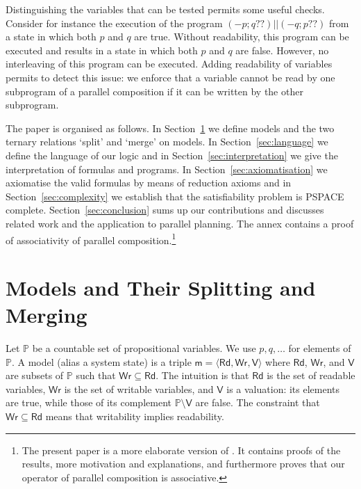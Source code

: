 \documentclass{llncs}
\newcommand{\atmset}{\mathtt{\mathbb X}}	%
\newcommand{\modl}{\mathsf m}
\newcommand{\pll}{ {||} }							%
\newcommand{\readable}[1]{\mathtt{r}_{#1}}
\newcommand{\readset}{\mathsf{Rd}}
\newcommand{\valuset}{\mathsf{V}}
\newcommand{\writable}[1]{\mathtt{w}_{#1}}
\newcommand{\writeset}{\mathsf{Wr}}
\newcommand{\testendo}{?\!\!?}			%
\newcommand{\assgnbotV}[1]{{\mathtt {-} #1}}
\newcommand{\propset}{\mathbb P}
\newcommand{\tuple}[1]{ \langle #1 \rangle}
\begin{document}
Distinguishing the variables that can be tested %
permits some useful checks.
Consider for instance the execution of the program $\left(\assgnbotV p ; q \testendo \right) \pll \left(\assgnbotV q ; p \testendo\right)$
from a state in which both $p$ and $q$ are true.
Without readability, this program can be executed and results in a state in which both $p$ and $q$ are false.
However, no interleaving of this program can be executed.
Adding readability of variables permits to detect this issue:
we enforce that a variable cannot be read by one subprogram of a parallel composition if it can be written by the other subprogram.

The paper is organised as follows.
In Section~\ref{sec:models} we define models and the two ternary relations `split' and `merge' on models. 
In Section~\ref{sec:language} we define the language of our logic and 
in Section~\ref{sec:interpretation} we give the interpretation of formulas and programs. 
In Section~\ref{sec:axiomatisation} we axiomatise the valid formulas by means of reduction axioms and
in Section~\ref{sec:complexity} we establish that the satisfiability problem is PSPACE complete. 
Section~\ref{sec:conclusion} sums up our contributions and discusses related work and the application to parallel planning. 
The annex contains a proof of associativity of parallel composition.\footnote{
The present paper is a more elaborate version of %
\cite{DBLP:conf/tap/BoudouHT19}. 
It contains proofs of the results, more motivation and explanations, and furthermore proves that our operator of parallel composition is associative. 
}


\section{Models and Their Splitting and Merging }\label{sec:models} 

Let $\propset$ be a countable set of propositional variables. 
We use $p, q,\ldots$ for elements of $\propset$. 
A model (alias a system state) is a %
triple $\modl = \tuple{\readset,\writeset,\valuset}$ 
where $\readset$, $\writeset$, and $\valuset$ are subsets of $\propset$ such that $\writeset \subseteq \readset$. 
The intuition is that $\readset$ is the set of readable variables, $\writeset$ is the set of writable variables, and $\valuset$ is a valuation: 
its elements are true, while those of its complement $\propset \setminus \valuset$ are false. 
The constraint that $\writeset \subseteq \readset$ means that writability implies readability. 
\end{document}
